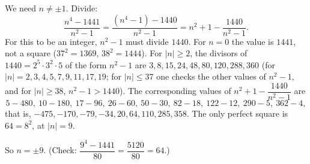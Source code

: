 We need $n\ne\pm1$. Divide:
\[
\dfrac{n^4-1441}{n^2-1}=\dfrac{(n^4-1)-1440}{n^2-1}=n^2+1-\dfrac{1440}{n^2-1}.
\]
For this to be an integer, $n^2-1$ must divide $1440$. For $n=0$ the value is $1441$, not a square ($37^2=1369$, $38^2=1444$). For $|n|\ge2$, the divisors of $1440=2^5\cdot3^2\cdot5$ of the form $n^2-1$ are $3,8,15,24,48,80,120,288,360$ (for $|n|=2,3,4,5,7,9,11,17,19$; for $|n|\le37$ one checks the other values of $n^2-1$, and for $|n|\ge38$, $n^2-1>1440$). The corresponding values of $n^2+1-\dfrac{1440}{n^2-1}$ are
\[
5-480,\ 10-180,\ 17-96,\ 26-60,\ 50-30,\ 82-18,\ 122-12,\ 290-5,\ 362-4,
\]
that is, $-475,-170,-79,-34,20,64,110,285,358$. The only perfect square is $64=8^2$, at $|n|=9$.

So $n=\boxed{\pm9}$. (Check: $\dfrac{9^4-1441}{80}=\dfrac{5120}{80}=64$.)
